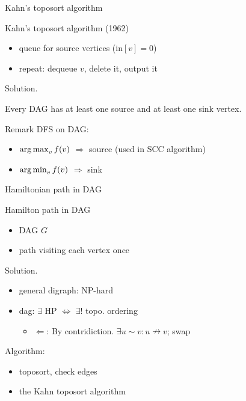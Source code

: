 \begin{frame}{Kahn's toposort algorithm}
  \begin{exampleblock}{Kahn's toposort algorithm (1962) }
    \begin{itemize}
      \item queue for source vertices ($\text{in}[v] = 0$)
      \item repeat: dequeue $v$, delete it, output it
    \end{itemize}
  \end{exampleblock}

  \begin{block}{Solution.}
    \begin{lemma}
      Every DAG has at least one source and at least one sink vertex.
    \end{lemma}
  \end{block}

  \begin{alertblock}{Remark}
    DFS on DAG:
    \begin{itemize}
      \item $\operatorname*{arg\,max}_{v} f(v)$ $\Rightarrow$ source (used in SCC algorithm)
      \item $\operatorname*{arg\,min}_{v} f(v)$ $\Rightarrow$ sink
    \end{itemize}
  \end{alertblock}
\end{frame}
\begin{frame}{Hamiltonian path in DAG}
  \begin{exampleblock}{Hamilton path in DAG }
    \begin{itemize}
      \item DAG $G$
      \item path visiting each vertex once
    \end{itemize}
  \end{exampleblock}

  \begin{block}{Solution.}
    \begin{itemize}
      \item general digraph: NP-hard
      \item dag: $\exists$ HP $\iff$ $\exists!$ topo. ordering
	\begin{itemize}
	  \item $\Leftarrow$: By contridiction. $\exists u \sim v: u \nrightarrow v$; swap
	\end{itemize}
    \end{itemize}

    Algorithm:
    \begin{itemize}
      \item toposort, check edges
      \item the Kahn toposort algorithm
    \end{itemize}
  \end{block}
\end{frame}
